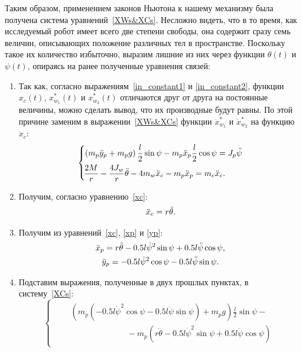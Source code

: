 \documentclass[12pt,a4paper,openany]{extarticle}
\begin{document}
Таким образом, применением законов Ньютона к нашему механизму была получена система уравнений~\eqref{XWs&XCs}.
Несложно видеть, что в то время, как исследуемый робот имеет всего две степени свободы, она содержит сразу семь величин, описывающих положение различных тел в пространстве.
Поскольку такое их количество избыточно, выразим лишние из них через функции $\theta(t)$ и $\psi(t)$, опираясь на ранее полученные уравнения связей:
\begin{enumerate}
	\item Так как, согласно выражениям~\eqref{in_constant1} и \eqref{in_constant2}, функции $x_c(t)$, $x_{w_1}^*(t)$ и $x_{w_2}^*(t)$
		отличаются друг от друга на постоянные величины, можно сделать вывод, что их производные будут равны.
		По этой причине заменим в выражении~\eqref{XWs&XCs} функции $\ddot{x}_{w_1}^*$ и $\ddot{x}_{w_2}^*$ на функцию $\ddot{x}_c$:
		\begin{equation}\label{XCs}
			\left\{
				\begin{aligned}
					\!&\left(m_p\ddot{y}_p + m_pg\right)\frac{l}{2}\sin\psi - m_p\ddot{x}_p\frac{l}{2}\cos\psi = J_p\ddot{\psi}\\
					\!&\frac{2M}{r} - \frac{4J_w}{r}\ddot{\theta} - 4m_w\ddot{x}_c - m_p\ddot{x}_p =
					 m_c\ddot{x}_c\ldotp
				\end{aligned}
			\right.
		\end{equation}
	\item Получим, согласно уравнению~\eqref{xc}:
		\begin{equation}
			\ddot x_c = r\ddot\theta\ldotp
		\end{equation}
	\item Получим из уравнений~\eqref{xc}, \eqref{xp} и \eqref{yp}:
		\begin{gather}
			\ddot x_p = r\ddot\theta - 0.5l\dot\psi^2\sin\psi + 0.5l\ddot\psi\cos\psi,\\
			\ddot y_p = - 0.5l\dot\psi^2\cos\psi - 0.5l\ddot\psi\sin\psi\ldotp
		\end{gather}
	\item Подставим выражения, полученные в двух прошлых пунктах, в систему~\eqref{XCs}:
		\begin{equation}
			\left\{
				\begin{aligned}					
					\!&\begin{split}					
						&\left(m_p\left(- 0.5l\dot\psi^2\cos\psi - 0.5l\ddot\psi\sin\psi\right) + m_pg\right)\frac{l}{2}\sin\psi - \\
						&\phantom{-------}-m_p\left(r\ddot\theta - 0.5l\dot\psi^2\sin\psi + 0.5l\ddot\psi\cos\psi\right)

\end{split}
\end{aligned}
\end{equation}
\end{enumerate}
\end{document}
